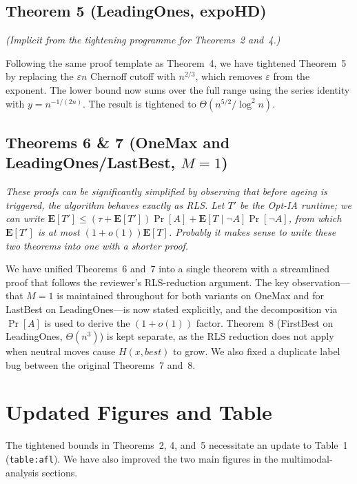 \documentclass[11pt]{article}
\newcommand{\RC}[1]{\textcolor{revcolor}{\textit{#1}}}
\newcommand{\resp}[1]{\smallskip\noindent #1\medskip}
\begin{document}
\subsection*{Theorem 5 (LeadingOnes, expoHD)}

\RC{(Implicit from the tightening programme for Theorems~2 and~4.)}

\resp{Following the same proof template as Theorem~4, we have tightened
Theorem~5 by replacing the $\varepsilon n$ Chernoff cutoff with $n^{2/3}$,
which removes $\varepsilon$ from the exponent. The lower bound now sums over
the full range using the series identity with $y = n^{-1/(2n)}$.
The result is tightened to $\Theta(n^{5/2}/\!\log^2 n)$.}

\subsection*{Theorems 6 \& 7 (OneMax and LeadingOnes/LastBest, $M=1$)}

\RC{These proofs can be significantly simplified by observing that before ageing
is triggered, the algorithm behaves exactly as RLS. Let $T'$ be the Opt-IA
runtime; we can write
$\mathbf{E}[T'] \le (\tau + \mathbf{E}[T'])\Pr[A] +
\mathbf{E}[T \mid \lnot A]\Pr[\lnot A]$,
from which $\mathbf{E}[T']$ is at most $(1+o(1))\mathbf{E}[T]$.
Probably it makes sense to unite these two theorems into one with a shorter proof.}

\resp{We have unified Theorems~6 and~7 into a single theorem with a streamlined
proof that follows the reviewer's RLS-reduction argument.
The key observation---that $M=1$ is maintained throughout for both variants on
OneMax and for LastBest on LeadingOnes---is now stated explicitly, and the
decomposition via $\Pr[A]$ is used to derive the $(1+o(1))$ factor.
Theorem~8 (FirstBest on LeadingOnes, $\Theta(n^3)$) is kept separate, as the
RLS reduction does not apply when neutral moves cause $H(x,\mathit{best})$ to
grow.
We also fixed a duplicate label bug between the original Theorems~7 and~8.}


\section*{Updated Figures and Table}

The tightened bounds in Theorems~2, 4, and~5 necessitate an update to
Table~1 (\texttt{table:afl}).  We have also improved the two main figures
in the multimodal-analysis sections.
\end{document}
